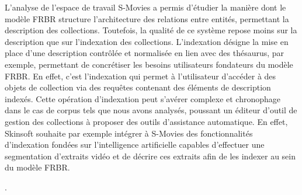 L’analyse de l’espace de travail S-Movies a permis d’étudier la manière dont le modèle FRBR structure l’architecture des relations entre entités, permettant la description des collections. Toutefois, la qualité de ce système repose moins sur la description que sur l’indexation des collections. L’indexation désigne la mise en place d’une description contrôlée et normalisée en lien avec des thésaurus, par exemple, permettant de concrétiser les besoins utilisateurs fondateurs du modèle FRBR. En effet, c’est l’indexation qui permet à l’utilisateur d’accéder à des objets de collection via des requêtes contenant des éléments de description indexés. Cette opération d’indexation peut s’avérer complexe et chronophage dans le cas de corpus tels que nous avons analysés, poussant un éditeur d’outil de gestion des collections à proposer des outils d’assistance automatique. En effet, Skinsoft souhaite par exemple intégrer à S-Movies des fonctionnalités d’indexation fondées sur l’intelligence artificielle capables d’effectuer une segmentation d’extraits vidéo et de décrire ces extraits afin de les indexer au sein du modèle FRBR.  
















. 